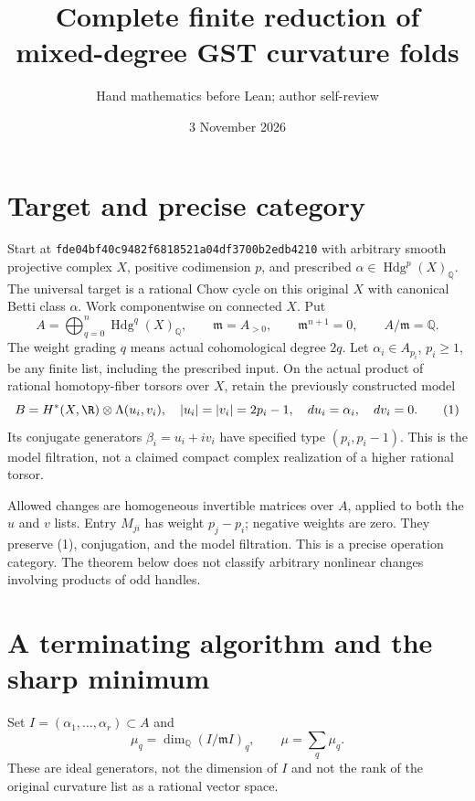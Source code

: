 \documentclass[11pt]{article}
\title{Complete finite reduction of mixed-degree GST curvature folds}
\author{Hand mathematics before Lean; author self-review}
\date{3 November 2026}
\newcommand{\Q}{\mathbb Q}
\newcommand{\m}{\mathfrak m}
\begin{document}
\maketitle

\section{Target and precise category}
Start at \texttt{fde04bf40c9482f6818521a04df3700b2edb4210} with arbitrary
smooth projective complex $X$, positive codimension $p$, and prescribed
$\alpha\in\operatorname{Hdg}^p(X)_\Q$. The universal target is a rational
Chow cycle on this original $X$ with canonical Betti class $\alpha$.
Work componentwise on connected $X$. Put
\[
 A=\bigoplus_{q=0}^{n}\operatorname{Hdg}^q(X)_\Q,\qquad
 \m=A_{>0},\qquad \m^{n+1}=0,\qquad A/\m=\Q.
\]
The weight grading $q$ means actual cohomological degree $2q$.
Let $\alpha_i\in A_{p_i}$, $p_i\geq1$, be any finite list, including
the prescribed input. On the actual product of rational homotopy-fiber
torsors over $X$, retain the previously constructed model
\[
 B=H^*(X,\R)\otimes\Lambda(u_i,v_i),\quad
 |u_i|=|v_i|=2p_i-1,\quad du_i=\alpha_i,\quad dv_i=0.                 \tag{1}
\]
Its conjugate generators $\beta_i=u_i+iv_i$ have specified type
$(p_i,p_i-1)$. This is the model filtration, not a claimed compact complex
realization of a higher rational torsor.

Allowed changes are homogeneous invertible matrices over $A$, applied
to both the $u$ and $v$ lists. Entry $M_{ji}$ has weight $p_j-p_i$;
negative weights are zero. They preserve (1), conjugation, and the model
filtration. This is a precise operation category. The theorem below does
not classify arbitrary nonlinear changes involving products of odd handles.

\section{A terminating algorithm and the sharp minimum}
Set $I=(\alpha_1,\ldots,\alpha_r)\subset A$ and
\[
 \mu_q=\dim_\Q(I/\m I)_q,\qquad \mu=\sum_q\mu_q.                  \tag{2}
\]
These are ideal generators, not the dimension of $I$ and not the rank of
the original curvature list as a rational vector space.
\end{document}
